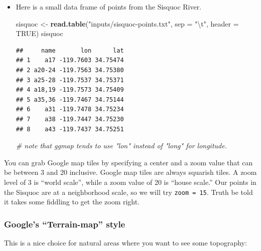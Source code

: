 \documentclass[]{book}
\newenvironment{Shaded}{\begin{snugshade}}{\end{snugshade}}
\newcommand{\KeywordTok}[1]{\textcolor[rgb]{0.13,0.29,0.53}{\textbf{{#1}}}}
\newcommand{\DataTypeTok}[1]{\textcolor[rgb]{0.13,0.29,0.53}{{#1}}}
\newcommand{\CharTok}[1]{\textcolor[rgb]{0.31,0.60,0.02}{{#1}}}
\newcommand{\StringTok}[1]{\textcolor[rgb]{0.31,0.60,0.02}{{#1}}}
\newcommand{\CommentTok}[1]{\textcolor[rgb]{0.56,0.35,0.01}{\textit{{#1}}}}
\newcommand{\OtherTok}[1]{\textcolor[rgb]{0.56,0.35,0.01}{{#1}}}
\newcommand{\NormalTok}[1]{{#1}}
\theoremstyle{definition}
\theoremstyle{definition}
\theoremstyle{remark}
\begin{document}
\begin{itemize}
\item
  Here is a small data frame of points from the Sisquoc River.

\begin{Shaded}
\begin{Highlighting}[]
\NormalTok{sisquoc <-}\StringTok{ }\KeywordTok{read.table}\NormalTok{(}\StringTok{"inputs/sisquoc-points.txt"}\NormalTok{, }\DataTypeTok{sep =} \StringTok{"}\CharTok{\textbackslash{}t}\StringTok{"}\NormalTok{, }\DataTypeTok{header =} \OtherTok{TRUE}\NormalTok{)}
\NormalTok{sisquoc}
\end{Highlighting}
\end{Shaded}

\begin{verbatim}
##     name       lon      lat
## 1    a17 -119.7603 34.75474
## 2 a20-24 -119.7563 34.75380
## 3 a25-28 -119.7537 34.75371
## 4 a18,19 -119.7573 34.75409
## 5 a35,36 -119.7467 34.75144
## 6    a31 -119.7478 34.75234
## 7    a38 -119.7447 34.75230
## 8    a43 -119.7437 34.75251
\end{verbatim}

\begin{Shaded}
\begin{Highlighting}[]
\CommentTok{# note that ggmap tends to use "lon" instead of "long" for longitude.}
\end{Highlighting}
\end{Shaded}
\end{itemize}

You can grab Google map tiles by specifying a center and a zoom value
that can be between 3 and 20 inclusive. Google map tiles are always
squarish tiles. A zoom level of 3 is ``world scale'', while a zoom value
of 20 is ``house scale.'' Our points in the Sisquoc are at a
neighborhood scale, so we will try \texttt{zoom\ =\ 15}. Truth be told
it takes some fiddling to get the zoom right.

\subsubsection{\texorpdfstring{Google's ``Terrain-map''
style}{Google's Terrain-map style}}\label{googles-terrain-map-style}

This is a nice choice for natural areas where you want to see some
topography:
\end{document}
